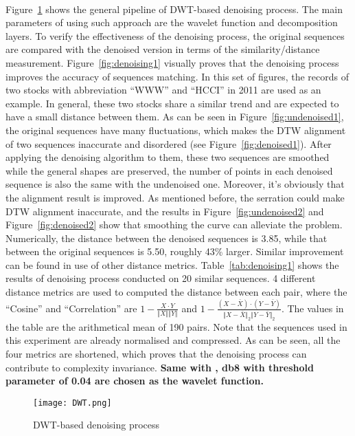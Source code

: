 \\Figure~\ref{fig:dwt1} shows the general pipeline of DWT-based denoising process. The main parameters of using such approach are the wavelet function and decomposition layers. To verify the effectiveness of the denoising process, the original sequences are compared with the denoised version in terms of the similarity/distance measurement. Figure~\ref{fig:denoising1} visually proves that the denoising process improves the accuracy of sequences matching. In this set of figures, the records of two stocks with abbreviation ``WWW'' and ``HCCI'' in 2011 are used as an example. In general, these two stocks share a similar trend and are expected to have a small distance between them. As can be seen in Figure~\ref{fig:undenoised1}, the original sequences have many fluctuations, which makes the DTW alignment of two sequences inaccurate and disordered (see Figure~\ref{fig:denoised1}). After applying the denoising algorithm to them, these two sequences are smoothed while the general shapes are preserved, the number of points in each denoised sequence is also the same with the undenoised one. Moreover, it's obviously that the alignment result is improved. As mentioned before, the serration could make DTW alignment inaccurate, and the results in Figure~\ref{fig:undenoised2} and Figure~\ref{fig:denoised2} show that smoothing the curve can alleviate the problem. Numerically, the distance between the denoised sequences is 3.85, while that between the original sequences is 5.50, roughly 43\% larger. Similar improvement can be found in use of other distance metrics. Table~\ref{tab:denoising1} shows the results of denoising process conducted on 20 similar sequences. 4 different distance metrics are used to computed the distance between each pair, where the ``Cosine'' and ``Correlation'' are $1-\frac{X \cdot Y}{\Vert X \Vert \Vert Y \Vert}$ and $1-\frac{(X-\bar{X}) \cdot (Y-\bar{Y}) }{\Vert X-\bar{X} \Vert_2 \Vert Y-\bar{Y} \Vert_2}$. The values in the table are the arithmetical mean of 190 pairs. Note that the sequences used in this experiment are already normalised and compressed. As can be seen, all the four metrics are shortened, which proves that the denoising process can contribute to complexity invariance. \textbf{Same with \cite{wu2021hybrid}, db8 with threshold parameter of 0.04 are chosen as the wavelet function.}
\begin{figure}[!htbp]
    \centering
    \texttt{[image: DWT.png]}
    \caption{DWT-based denoising process}
    \label{fig:dwt1}
\end{figure} 

